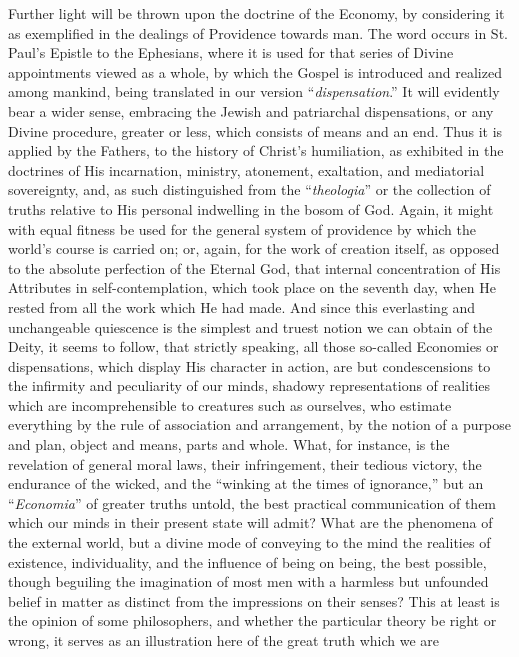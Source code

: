 Further light will be thrown upon the doctrine of the Economy, by
considering it as exemplified in the dealings of Providence towards
man. The word occurs in St. Paul's Epistle to the Ephesians, where it
is used for that series of Divine appointments viewed as a whole, by
which the Gospel is introduced and realized among mankind, being
translated in our version ``\emph{dispensation}.'' It will
evidently bear a wider sense, embracing the Jewish and patriarchal
dispensations, or any Divine procedure, greater or less, which
consists of means and an end. Thus it is applied by the Fathers, to
the history of Christ's humiliation, as exhibited in the doctrines of
His incarnation, ministry, atonement, exaltation, and mediatorial
sovereignty, and, as such distinguished from the ``\emph{theologia}''
or the collection of truths relative to His personal indwelling in the
bosom of God. Again, it might with equal fitness be used for the
general system of providence by which the world's course is
carried on; or, again, for the work of creation itself, as opposed to
the absolute perfection of the Eternal God, that internal
concentration of His Attributes in self-contemplation, which took
place on the seventh day, when He rested from all the work which He
had made. And since this everlasting and unchangeable quiescence is
the simplest and truest notion we can obtain of the Deity, it seems to
follow, that strictly speaking, all those so-called Economies or
dispensations, which display His character in action, are but
condescensions to the infirmity and peculiarity of our minds, shadowy
representations of realities which are incomprehensible to creatures
such as ourselves, who estimate everything by the rule of association
and arrangement, by the notion of a purpose and plan, object and
means, parts and whole. What, for instance, is the revelation of
general moral laws, their infringement, their tedious victory, the
endurance of the wicked, and the ``winking at the times of
ignorance,'' but an ``\emph{Economia}'' of greater truths untold,
the best practical communication of them which our minds in their
present state will admit? What are the phenomena of the external
world, but a divine mode of conveying to the mind the realities of
existence, individuality, and the influence of being on being, the
best possible, though beguiling the imagination of most men with a
harmless but unfounded belief in matter as distinct from the
impressions on their senses? This at least is the opinion of some
philosophers, and whether the particular theory be right or wrong, it
serves as an illustration here of the great truth which we are
